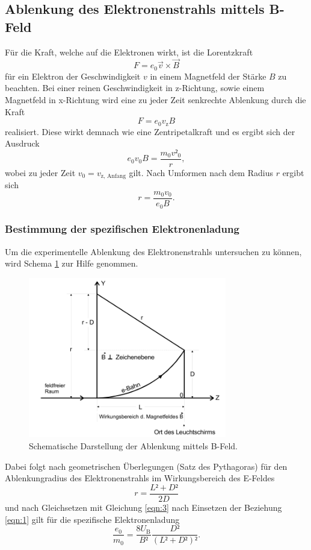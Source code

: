 \subsection{Ablenkung des Elektronenstrahls mittels B-Feld}
Für die Kraft, welche auf die Elektronen wirkt, ist die Lorentzkraft
\begin{equation}
  F = e_0 \vec{v} \times \vec{B}
\end{equation}
für ein Elektron der Geschwindigkeit $v$ in einem Magnetfeld der Stärke $B$ zu beachten.
Bei einer reinen Geschwindigkeit in z-Richtung, sowie einem Magnetfeld in x-Richtung wird eine zu jeder Zeit senkrechte Ablenkung durch die Kraft
\begin{equation}
  F = e_0 v_{\text{z}} B
\end{equation}
realisiert.
Diese wirkt demnach wie eine Zentripetalkraft und es ergibt sich der Ausdruck
\begin{equation}
  e_0 v_0 B = \frac{m_0 v²_0}{r},
\end{equation}
wobei zu jeder Zeit $v_0 = v_{\text{z, Anfang}}$ gilt.
Nach Umformen nach dem Radius $r$ ergibt sich
\begin{equation}
  r = \frac{m_0 v_0}{e_0 B}. \label{eqn:3}
\end{equation}
\clearpage

\subsubsection{Bestimmung der spezifischen Elektronenladung}
Um die experimentelle Ablenkung des Elektronenstrahls untersuchen zu können, wird Schema \ref{fig:2} zur Hilfe genommen.
\begin{figure}
  \centering
  \includegraphics[height=7cm]{ressources/schema2.png}
  \caption{Schematische Darstellung der Ablenkung mittels B-Feld. \cite{skript2}}
  \label{fig:2}
\end{figure}
Dabei folgt nach geometrischen Überlegungen (Satz des Pythagoras) für den Ablenkungradius des Elektronenstrahls im Wirkungsbereich des E-Feldes
\begin{equation}
  r = \frac{L²+D²}{2D}
\end{equation}
und nach Gleichsetzen mit Gleichung \eqref{eqn:3} nach Einsetzen der Beziehung \eqref{eqn:1} gilt für die spezifische Elektronenladung
\begin{equation}
  \frac{e_0}{m_0} = \frac{8 U_{\text{B}}}{B²} \frac{D²}{(L²+D²)²}. \label{eqn:4}
\end{equation}


